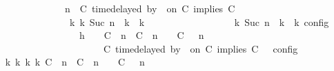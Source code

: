 \begin{isabellebody}
\ \ \ \ \ \ \ \ \ \ \ \ \ \ {\isacharparenleft}{\isacharparenleft}{\isasymGamma}{\isacharcomma}\ n\ {\isasymturnstile}\ {\isacharparenleft}{\isacharparenleft}C\ time{\isacharminus}delayed\ by\ {\isasymdelta}{\isasymtau}\ on\ C\ implies\ C\ {\isacharhash}\ {\isasymPsi}{\isacharparenright}\ {\isasymtriangleright}\ {\isasymPhi}{\isacharparenright}\isanewline
\ \ \ \ \ \ \ \ \ \ \ \ \ \ \ \ {\isasymhookrightarrow}\isactrlbsup k\isactrlesup \ {\isacharparenleft}{\isasymGamma}\isactrlsub k{\isacharcomma}\ Suc\ n\ {\isasymturnstile}\ {\isasymPsi}\isactrlsub k\ {\isasymtriangleright}\ {\isasymPhi}\isactrlsub k{\isacharparenright}{\isacharparenright}\isanewline
\ \ \ \ \ \ \ \ \ \ \ \ \ \ {\isasymand}\ {\isasymrho}\ {\isasymin}\ {\isasymlbrakk}\ {\isasymGamma}\isactrlsub k{\isacharcomma}\ Suc\ n\ {\isasymturnstile}\ {\isasymPsi}\isactrlsub k\ {\isasymtriangleright}\ {\isasymPhi}\isactrlsub k\ {\isasymrbrakk}\isactrlsub c\isactrlsub o\isactrlsub n\isactrlsub f\isactrlsub i\isactrlsub g{\isacartoucheclose}\isanewline
\ \ \ \ \ \ \isamarkupfalse%
\ {\isacharminus}\isanewline
\ \ \ \ \ \ \ \ \isamarkupfalse%
\ h{}{\isacharcolon}\ {\isacartoucheopen}{\isasymrho}\ {\isasymin}\ {\isasymlbrakk}\ {\isacharparenleft}{\isacharparenleft}C\ {\isasymUp}\ n{\isacharparenright}\ {\isacharhash}\ {\isacharparenleft}C\ {\isacharat}\ n\ {\isasymoplus}\ {\isasymdelta}{\isasymtau}\ {\isasymRightarrow}\ C\ {\isacharhash}\ {\isasymGamma}{\isacharparenright}{\isacharcomma}\ n\isanewline
\ \ \ \ \ \ \ \ \ \ \ \ \ \ \ \ \ \ \ \ {\isasymturnstile}\ {\isasymPsi}\ {\isasymtriangleright}\ {\isacharparenleft}{\isacharparenleft}C\ time{\isacharminus}delayed\ by\ {\isasymdelta}{\isasymtau}\ on\ C\ implies\ C\ {\isacharhash}\ {\isasymPhi}{\isacharparenright}\ {\isasymrbrakk}\isactrlsub c\isactrlsub o\isactrlsub n\isactrlsub f\isactrlsub i\isactrlsub g{\isacartoucheclose}\isanewline
\ \ \ \ \ \ \ \ \isamarkupfalse%
\ \isamarkupfalse%
\ {\isacartoucheopen}{\isasymexists}{\isasymGamma}\isactrlsub k\ {\isasymPsi}\isactrlsub k\ {\isasymPhi}\isactrlsub k\ k{\isachardot}\ {\isacharparenleft}{\isacharparenleft}{\isacharparenleft}{\isacharparenleft}C\ {\isasymUp}\ n{\isacharparenright}\ {\isacharhash}\ {\isacharparenleft}C\ {\isacharat}\ n\ {\isasymoplus}\ {\isasymdelta}{\isasymtau}\ {\isasymRightarrow}\ C\ {\isacharhash}\ {\isasymGamma}{\isacharparenright}{\isacharcomma}\ n\isanewline

\end{isabellebody}
